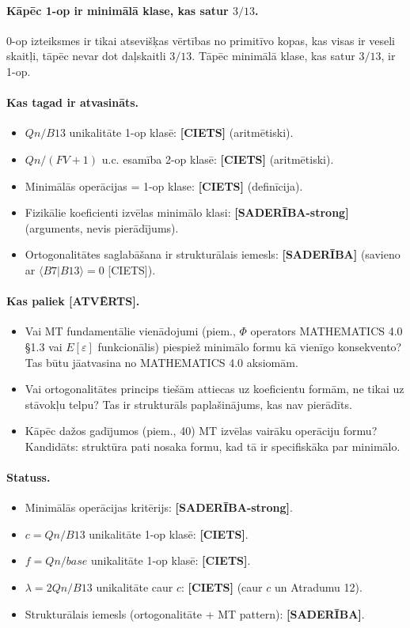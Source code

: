 \documentclass[12pt,a4paper]{article}
\begin{document}
\paragraph{Kāpēc 1-op ir minimālā klase, kas satur $3/13$.}
0-op izteiksmes ir tikai atsevišķas vērtības no primitīvo kopas, kas visas ir veseli skaitļi, tāpēc nevar dot daļskaitli $3/13$. Tāpēc minimālā klase, kas satur $3/13$, ir 1-op.

\paragraph{Kas tagad ir atvasināts.}
\begin{itemize}
    \item $Qn/B13$ unikalitāte 1-op klasē: \textbf{[CIETS]} (aritmētiski).
    \item $Qn/(FV+1)$ u.c. esamība 2-op klasē: \textbf{[CIETS]} (aritmētiski).
    \item Minimālās operācijas = 1-op klase: \textbf{[CIETS]} (definīcija).
    \item Fizikālie koeficienti izvēlas minimālo klasi: \textbf{[SADERĪBA-strong]} (arguments, nevis pierādījums).
    \item Ortogonalitātes saglabāšana ir strukturālais iemesls: \textbf{[SADERĪBA]} (savieno ar $\langle B7|B13\rangle=0$ [CIETS]).
\end{itemize}

\paragraph{Kas paliek [ATVĒRTS].}
\begin{itemize}
    \item Vai MT fundamentālie vienādojumi (piem., $\Phi$ operators MATHEMATICS 4.0 §1.3 vai $E[\varepsilon]$ funkcionālis) piespiež minimālo formu kā vienīgo konsekvento? Tas būtu jāatvasina no MATHEMATICS 4.0 aksiomām.
    \item Vai ortogonalitātes princips tiešām attiecas uz koeficientu formām, ne tikai uz stāvokļu telpu? Tas ir strukturāls paplašinājums, kas nav pierādīts.
    \item Kāpēc dažos gadījumos (piem., 40) MT izvēlas vairāku operāciju formu? Kandidāts: struktūra pati nosaka formu, kad tā ir specifiskāka par minimālo.
\end{itemize}

\paragraph{Statuss.}
\begin{itemize}
    \item Minimālās operācijas kritērijs: \textbf{[SADERĪBA-strong]}.
    \item $c = Qn/B13$ unikalitāte 1-op klasē: \textbf{[CIETS]}.
    \item $f = Qn/base$ unikalitāte 1-op klasē: \textbf{[CIETS]}.
    \item $\lambda = 2Qn/B13$ unikalitāte caur $c$: \textbf{[CIETS]} (caur $c$ un Atradumu 12).
    \item Strukturālais iemesls (ortogonalitāte + MT pattern): \textbf{[SADERĪBA]}.
\end{itemize}
\end{document}
